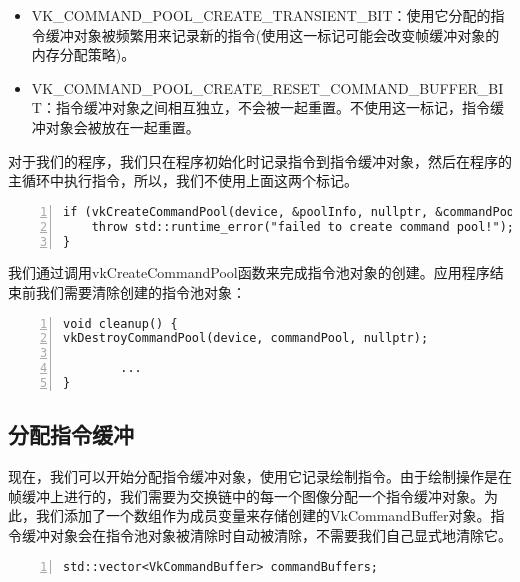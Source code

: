 \documentclass{ctexart}
\begin{document}
\begin{itemize}
	\item VK\_COMMAND\_POOL\_CREATE\_TRANSIENT\_BIT：使用它分配的指令缓冲对象被频繁用来记录新的指令(使用这一标记可能会改变帧缓冲对象的内存分配策略)。
	\item VK\_COMMAND\_POOL\_CREATE\_RESET\_COMMAND\_BUFFER\_BIT：指令缓冲对象之间相互独立，不会被一起重置。不使用这一标记，指令缓冲对象会被放在一起重置。
\end{itemize}

对于我们的程序，我们只在程序初始化时记录指令到指令缓冲对象，然后在程序的主循环中执行指令，所以，我们不使用上面这两个标记。

\begin{lstlisting}[language={[ANSI]C},keywordstyle=\color{blue!70},commentstyle=\color{red!50!green!50!blue!50},frame=shadowbox, rulesepcolor=\color{red!20!green!20!blue!20},basicstyle=\small,numbers=left, numberstyle=\tiny,breaklines=true]
if (vkCreateCommandPool(device, &poolInfo, nullptr, &commandPool) != VK_SUCCESS) {
	throw std::runtime_error("failed to create command pool!");
}
\end{lstlisting}

我们通过调用vkCreateCommandPool函数来完成指令池对象的创建。应用程序结束前我们需要清除创建的指令池对象：

\begin{lstlisting}[language={[ANSI]C},keywordstyle=\color{blue!70},commentstyle=\color{red!50!green!50!blue!50},frame=shadowbox, rulesepcolor=\color{red!20!green!20!blue!20},basicstyle=\small,numbers=left, numberstyle=\tiny,breaklines=true]
void cleanup() {
vkDestroyCommandPool(device, commandPool, nullptr);

		...
}
\end{lstlisting}

\subsection{分配指令缓冲}

现在，我们可以开始分配指令缓冲对象，使用它记录绘制指令。由于绘制操作是在帧缓冲上进行的，我们需要为交换链中的每一个图像分配一个指令缓冲对象。为此，我们添加了一个数组作为成员变量来存储创建的VkCommandBuffer对象。指令缓冲对象会在指令池对象被清除时自动被清除，不需要我们自己显式地清除它。

\begin{lstlisting}[language={[ANSI]C},keywordstyle=\color{blue!70},commentstyle=\color{red!50!green!50!blue!50},frame=shadowbox, rulesepcolor=\color{red!20!green!20!blue!20},basicstyle=\small,numbers=left, numberstyle=\tiny,breaklines=true]
std::vector<VkCommandBuffer> commandBuffers;
\end{lstlisting}
\end{document}
